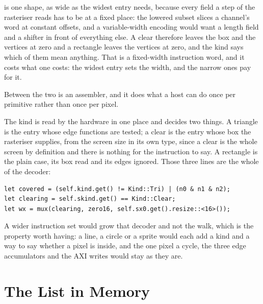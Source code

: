 \documentclass[journal,9pt]{IEEEtran}
\newcommand{\gpupart}[4]{%
}
\begin{document}
\gpupart{op.rs}{op}{The instruction set: \code{Op} as a program writes
it, \code{Kind} as the hardware reads it, and \code{Insn} as it goes
on the wire.}{lst:g-op}

 is one shape, as wide as the widest entry needs, because
every field a step of the rasteriser reads has to be at a fixed place:
the lowered subset slices a channel's word at constant offsets, and a
variable-width encoding would want a length field and a shifter in
front of everything else. A clear therefore leaves the box and the
vertices at zero and a rectangle leaves the vertices at zero, and the
kind says which of them mean anything. That is a fixed-width
instruction word, and it costs what one costs: the widest entry sets
the width, and the narrow ones pay for it.

Between the two is an assembler, and it does what a host can do once
per primitive rather than once per pixel.

\gpupart{op.rs}{encode}{\code{Op::encode}: the assembler. It clips the
box to the screen, winds the triangle so that its inside is where
every edge function is non-negative, and drops an entry that would
draw nothing.}{lst:g-encode}

The kind is read by the hardware in one place and decides two things.
A triangle is the entry whose edge functions are tested; a clear is
the entry whose box the rasteriser supplies, from the screen size in
its own type, since a clear is the whole screen by definition and
there is nothing for the instruction to say. A rectangle is the plain
case, its box read and its edges ignored. Those three lines are the
whole of the decoder:

\begin{lstlisting}[frame=none,numbers=none]
let covered = (self.kind.get() != Kind::Tri) | (n0 & n1 & n2);
let clearing = self.skind.get() == Kind::Clear;
let wx = mux(clearing, zero16, self.sx0.get().resize::<16>());
\end{lstlisting}

A wider instruction set would grow that decoder and not the walk,
which is the property worth having: a line, a circle or a sprite would
each add a kind and a way to say whether a pixel is inside, and the
one pixel a cycle, the three edge accumulators and the AXI writes
would stay as they are.

\section{The List in Memory}
\label{sec:g-mem}
\end{document}
